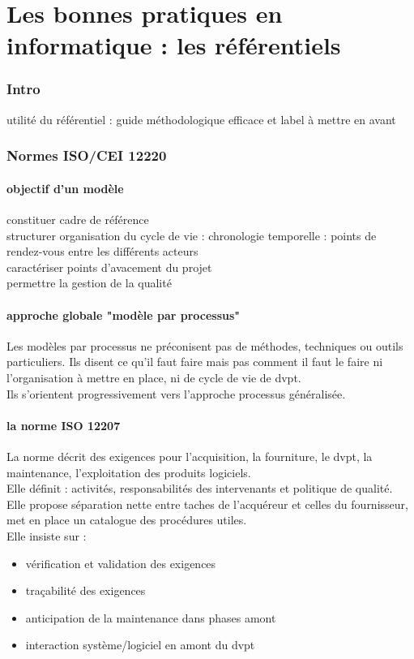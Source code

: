 \part{Les bonnes pratiques en informatique : les référentiels}

\section{Intro}

utilité du référentiel : guide méthodologique efficace et label à mettre en avant

\section{Normes ISO/CEI 12220}

	\subsection{objectif d’un modèle}

constituer cadre de référence\\
structurer organisation du cycle de vie : chronologie temporelle : points de rendez-vous entre les différents acteurs\\
caractériser points d’avacement du projet\\
permettre la gestion de la qualité\\

	\subsection{approche globale "modèle par processus"}

Les modèles par processus ne préconisent pas de méthodes, techniques ou outils particuliers. Ils disent ce qu’il faut faire mais pas comment il faut le faire ni l’organisation à mettre en place, ni de cycle de vie de dvpt.\\
Ils s’orientent progressivement vers l’approche processus généralisée.

	\subsection{la norme ISO 12207}

La norme décrit des exigences pour l’acquisition, la fourniture, le dvpt, la maintenance, l’exploitation des produits logiciels.\\
Elle définit : activités, responsabilités des intervenants et politique de qualité.\\
Elle propose séparation nette entre taches de l’acquéreur et celles du fournisseur, met en place un catalogue des procédures utiles.\\
Elle insiste sur :
\begin{itemize}
\item vérification et validation des exigences
\item traçabilité des exigences
\item anticipation de la maintenance dans phases amont
\item interaction système/logiciel en amont du dvpt
\end{itemize}


